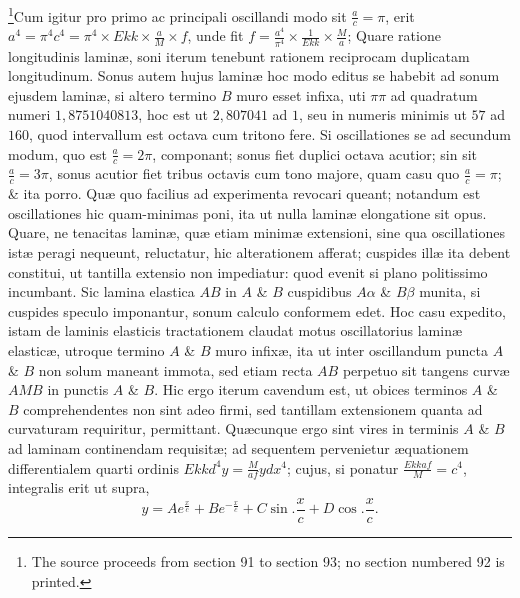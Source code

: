 \footnote{The source proceeds from section 91 to section 93; no section numbered 92 is printed.}Cum igitur pro primo ac principali oscillandi modo sit $\frac ac=\pi$, erit $a^4=\pi^4c^4=\pi^4\times Ekk\times\frac aM\times f$, unde fit $f=\frac{a^4}{\pi^4}\times\frac1{Ekk}\times\frac Ma$; Quare ratione longitudinis laminæ, soni iterum tenebunt rationem reciprocam duplicatam longitudinum. Sonus autem hujus laminæ hoc modo editus se habebit ad sonum ejusdem laminæ, si altero termino $B$ muro esset infixa, uti $\pi\pi$ ad quadratum numeri $1{,}8751040813$, hoc est ut $2{,}807041$ ad $1$, seu in numeris minimis ut $57$ ad $160$, quod intervallum est octava cum tritono fere. Si oscillationes se ad secundum modum, quo est $\frac ac=2\pi$, componant; sonus fiet duplici octava acutior; sin sit $\frac ac=3\pi$, sonus acutior fiet tribus octavis cum tono majore, quam casu quo $\frac ac=\pi$; \& ita porro. Quæ quo facilius ad experimenta revocari queant; notandum est oscillationes hic quam-minimas poni, ita ut nulla laminæ elongatione sit opus. Quare, ne tenacitas laminæ, quæ etiam minimæ extensioni, sine qua oscillationes istæ peragi nequeunt, reluctatur, hic alterationem afferat; cuspides illæ ita debent constitui, ut tantilla extensio non impediatur: quod evenit si plano politissimo incumbant. Sic lamina elastica $AB$ in $A$ \& $B$ cuspidibus $A\alpha$ \& $B\beta$ munita, si cuspides speculo imponantur, sonum calculo conformem edet.
Hoc casu expedito, istam de laminis elasticis tractationem claudat motus oscillatorius laminæ elasticæ, utroque termino $A$ \& $B$ muro infixæ, ita ut inter oscillandum puncta $A$ \& $B$ non solum maneant immota, sed etiam recta $AB$ perpetuo sit tangens curvæ $AMB$ in punctis $A$ \& $B$. Hic ergo iterum cavendum est, ut obices terminos $A$ \& $B$ comprehendentes non sint adeo firmi, sed tantillam extensionem quanta ad curvaturam requiritur, permittant. Quæcunque ergo sint vires in terminis $A$ \& $B$ ad laminam continendam requisitæ; ad sequentem pervenietur æquationem differentialem quarti ordinis $Ekkd^4y=\frac M{af}ydx^4$; cujus, si ponatur $\frac{Ekkaf}{M}=c^4$, integralis erit ut supra,
\[y=Ae^{\frac xc}+Be^{-\frac xc}+C\sin.\frac xc+D\cos.\frac xc.\]

